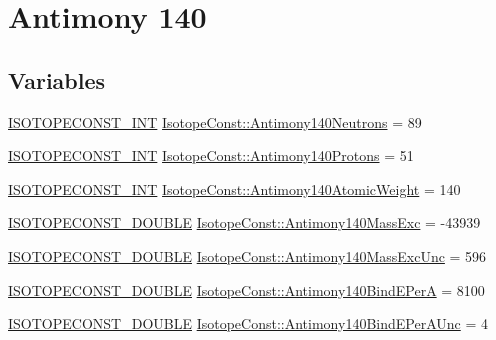 \hypertarget{group___isotope_const-_antimony-_sb140}{}\section{Antimony 140}
\label{group___isotope_const-_antimony-_sb140}
\subsection*{Variables}
\begin{DoxyCompactItemize}
\item 
\mbox{\hyperlink{group___isotope_const-_macros_ga5f18360b3e99483a35c32d789e62621c}{I\+S\+O\+T\+O\+P\+E\+C\+O\+N\+S\+T\+\_\+\+I\+NT}} \mbox{\hyperlink{group___isotope_const-_antimony-_sb140_ga960b96d844d2710b6556e036cd750813}{Isotope\+Const\+::\+Antimony140\+Neutrons}} = 89
\item 
\mbox{\hyperlink{group___isotope_const-_macros_ga5f18360b3e99483a35c32d789e62621c}{I\+S\+O\+T\+O\+P\+E\+C\+O\+N\+S\+T\+\_\+\+I\+NT}} \mbox{\hyperlink{group___isotope_const-_antimony-_sb140_ga85c23ce090d5355d3f708f1f33edeb91}{Isotope\+Const\+::\+Antimony140\+Protons}} = 51
\item 
\mbox{\hyperlink{group___isotope_const-_macros_ga5f18360b3e99483a35c32d789e62621c}{I\+S\+O\+T\+O\+P\+E\+C\+O\+N\+S\+T\+\_\+\+I\+NT}} \mbox{\hyperlink{group___isotope_const-_antimony-_sb140_gaa6d0e2212dea188aaeb4c999361f781e}{Isotope\+Const\+::\+Antimony140\+Atomic\+Weight}} = 140
\item 
\mbox{\hyperlink{group___isotope_const-_macros_ga8f45a7272ce02c0b4c65c44636ed719a}{I\+S\+O\+T\+O\+P\+E\+C\+O\+N\+S\+T\+\_\+\+D\+O\+U\+B\+LE}} \mbox{\hyperlink{group___isotope_const-_antimony-_sb140_gae47f4aeb0a2be1409ffa4ee7543590b0}{Isotope\+Const\+::\+Antimony140\+Mass\+Exc}} = -\/43939
\item 
\mbox{\hyperlink{group___isotope_const-_macros_ga8f45a7272ce02c0b4c65c44636ed719a}{I\+S\+O\+T\+O\+P\+E\+C\+O\+N\+S\+T\+\_\+\+D\+O\+U\+B\+LE}} \mbox{\hyperlink{group___isotope_const-_antimony-_sb140_ga0e5dfb3821f4b246fb747e6968bbf7f0}{Isotope\+Const\+::\+Antimony140\+Mass\+Exc\+Unc}} = 596
\item 
\mbox{\hyperlink{group___isotope_const-_macros_ga8f45a7272ce02c0b4c65c44636ed719a}{I\+S\+O\+T\+O\+P\+E\+C\+O\+N\+S\+T\+\_\+\+D\+O\+U\+B\+LE}} \mbox{\hyperlink{group___isotope_const-_antimony-_sb140_ga9c46eb48abe854785ae9ef5cf42e7372}{Isotope\+Const\+::\+Antimony140\+Bind\+E\+PerA}} = 8100
\item 
\mbox{\hyperlink{group___isotope_const-_macros_ga8f45a7272ce02c0b4c65c44636ed719a}{I\+S\+O\+T\+O\+P\+E\+C\+O\+N\+S\+T\+\_\+\+D\+O\+U\+B\+LE}} \mbox{\hyperlink{group___isotope_const-_antimony-_sb140_ga3987bd0542c1d577a1200652bd06ddc8}{Isotope\+Const\+::\+Antimony140\+Bind\+E\+Per\+A\+Unc}} = 4

\end{DoxyCompactItemize}
